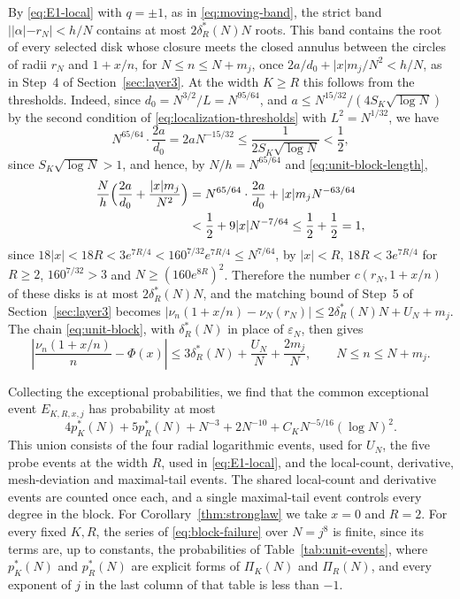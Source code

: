 By \eqref{eq:E1-local} with $q=\pm1$, as in \eqref{eq:moving-band}, the
strict band $||\alpha|-r_N|<h/N$ contains at most $2\delta_R^*(N)N$
roots.
This band contains the root of every selected disk whose closure meets
the closed annulus between the circles of radii $r_N$ and $1+x/n$, for
$N\le n\le N+m_j$, once $2a/d_0+|x|m_j/N^2<h/N$, as in Step~4 of
Section~\ref{sec:layer3}. At the width $K\ge R$ this follows from the
thresholds. Indeed, since $d_0=N^{3/2}/L=N^{95/64}$, and
$a\le N^{15/32}/(4S_K\sqrt{\log N})$ by the second condition of
\eqref{eq:localization-thresholds} with $L^2=N^{1/32}$, we have
\[
 N^{65/64}\cdot\frac{2a}{d_0}=2aN^{-15/32}
 \le\frac1{2S_K\sqrt{\log N}}<\frac12,
\]
since $S_K\sqrt{\log N}>1$, and hence, by $N/h=N^{65/64}$ and
\eqref{eq:unit-block-length},
\begin{align*}
 \frac Nh\Bigl(\frac{2a}{d_0}+\frac{|x|m_j}{N^2}\Bigr)
 &=N^{65/64}\cdot\frac{2a}{d_0}+|x|m_jN^{-63/64}\\
 &<\frac12+9|x|N^{-7/64}\le\frac12+\frac12=1,
\end{align*}
since
$18|x|<18R<3e^{7R/4}<160^{7/32}e^{7R/4}\le N^{7/64}$, by $|x|<R$,
$18R<3e^{7R/4}$ for $R\ge2$, $160^{7/32}>3$ and $N\ge(160e^{8R})^2$.
Therefore the number $c(r_N,1+x/n)$ of these disks is at most
$2\delta_R^*(N)N$, and the matching bound of Step~5 of
Section~\ref{sec:layer3} becomes
$|\nu_n(1+x/n)-\nu_N(r_N)|\le2\delta_R^*(N)N+U_N+m_j$.
The chain \eqref{eq:unit-block}, with $\delta_R^*(N)$ in place of
$\varepsilon_N$, then gives
\[
 \left|\frac{\nu_n(1+x/n)}n-\Phi(x)\right|
 \le3\delta_R^*(N)+\frac{U_N}N+\frac{2m_j}{N},
 \qquad N\le n\le N+m_j.
\]

Collecting the exceptional probabilities, we find that the common
exceptional event $E_{K,R,x,j}$ has probability at most
\begin{equation}
 4p_K^*(N)+5p_R^*(N)+N^{-3}+2N^{-10}
                 +C_KN^{-5/16}(\log N)^2.\label{eq:block-failure}
\end{equation}
This union consists of the four radial logarithmic events, used for
$U_N$, the five probe events at the width $R$, used in
\eqref{eq:E1-local}, and the local-count, derivative, mesh-deviation and
maximal-tail events. The shared local-count and derivative events are
counted once each, and a single maximal-tail event controls every degree
in the block. For Corollary~\ref{thm:stronglaw} we take $x=0$ and $R=2$.
For every fixed $K,R$, the series of \eqref{eq:block-failure} over
$N=j^8$ is finite, since its terms are, up to constants, the
probabilities of Table~\ref{tab:unit-events}, where $p_K^*(N)$ and
$p_R^*(N)$ are explicit forms of $\Pi_K(N)$ and $\Pi_R(N)$, and every
exponent of $j$ in the last column of that table is less than $-1$.

